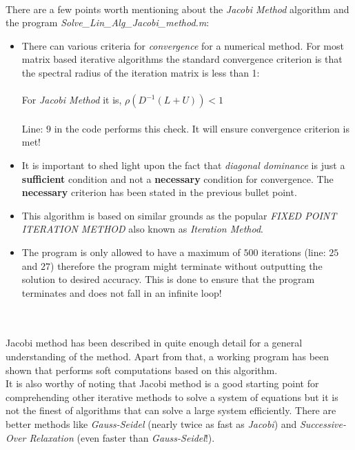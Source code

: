 \documentclass[main]{subfiles}
\begin{document}
    
    \noindent{\Huge \textcolor{teal}{Discussions}} \\

    There are a few points worth mentioning about the \textit{Jacobi Method} algorithm and the program 
    \textit{Solve\_Lin\_Alg\_Jacobi\_method.m}:
    \\
    \begin{itemize}
        
        \item There can various criteria for \textit{convergence} for a numerical method. 
        For most matrix based iterative algorithms the standard convergence criterion is that the spectral radius of the iteration 
        matrix is less than 1:\\\\
        For \textit{Jacobi Method} it is,   
        $\rho \left( D^{-1} \left( L + U \right) \right) < 1$
        \\\\
        Line: {\small $9$} in the code performs this check. It will ensure convergence criterion is met! 


        \item It is important to shed light upon the fact that \textit{diagonal dominance} is just a 
        \textbf{sufficient} condition and not a \textbf{necessary} condition for convergence. The \textbf{necessary} criterion 
        has been stated in the previous bullet point.

        \item This algorithm is based on similar grounds as the popular \textit{FIXED POINT ITERATION METHOD} 
        also known as \textit{Iteration Method}.

        \item The program is only allowed to have a maximum of $500$ iterations (line: $25$ and $27$) therefore the program might terminate without 
        outputting the solution to desired accuracy. This is done to ensure that the program terminates and does not fall in an infinite loop!
    \\

    \end{itemize}
    
    \noindent{\Huge \textcolor{teal}{Conclusion}} \\\\
    Jacobi method has been described in quite enough detail for a general understanding of the method. Apart from that, a working program has been shown that performs soft computations 
    based on this algorithm. \\
    It is also worthy of noting that Jacobi method is a good starting point for comprehending other iterative methods to solve a system of equations but it is not the finest 
        of algorithms that can solve a large system efficiently. There are better methods like \textit{Gauss-Seidel} (nearly twice as fast as \textit{Jacobi}) and \textit{Successive-Over Relaxation} (even faster than \textit{Gauss-Seidel}!). 
    
\end{document}

